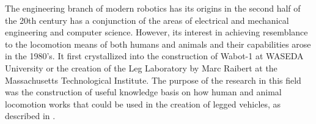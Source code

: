 The engineering branch of modern robotics has its origins in the second half of the 20th century has a conjunction of the areas of electrical and mechanical engineering and computer science.
However, its interest in achieving resemblance to the locomotion means of both humans and animals  and their capabilities arose in the 1980's.
It first crystallized into the construction of Wabot-1 at WASEDA University or the creation of the Leg Laboratory by Marc Raibert at the Massachusetts Technological Institute.
The purpose of the research in this field was the construction of useful knowledge basis on how human and animal locomotion works that could be used in the creation of legged vehicles, as described in \cite{mit_leg_lab1}.




